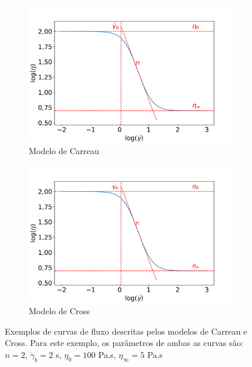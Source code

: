 			\begin{figure}[h]
				\begin{subfigure}[t]{0.5\textwidth}
					\centering
					\includegraphics[width=\textwidth]{./imagens/reologia/Carreau}
					\caption{Modelo de Carreau}
					\label{fig:reologia_modelo_carreau}
				\end{subfigure}%
				\begin{subfigure}[t]{0.5\textwidth}
					\centering
					\includegraphics[width=\textwidth]{./imagens/reologia/Cross}
					\caption{Modelo de Cross}
					\label{fig:reologia_modelo_cross}
				\end{subfigure}
				\caption{Exemplos de curvas de fluxo descritas pelos modelos de Carreau e Cross. Para este exemplo, os parâmetros de ambas as curvas são: \(n=2\), \(\dot{\gamma}_b=2\) s\menosUm, \(\eta_0=100\) Pa.s, \(\eta_{\infty}=5\) Pa.s}
				\label{fig:reologia_modelos}
			
			\end{figure}
			
